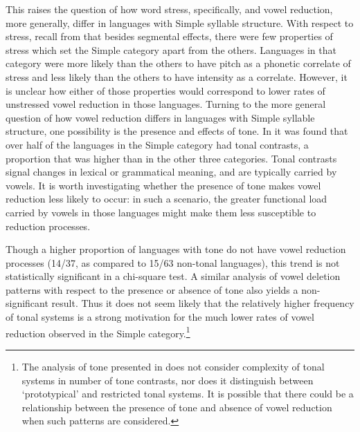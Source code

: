   This raises the question of how word stress, specifically, and vowel reduction, more generally, differ in languages with Simple syllable structure. With respect to stress, recall from  that besides segmental effects, there were few properties of stress which set the Simple category apart from the others. Languages in that category were more likely than the others to have pitch as a phonetic correlate of stress and less likely than the others to have intensity as a correlate. However, it is unclear how either of those properties would correspond to lower rates of unstressed vowel reduction in those languages. Turning to the more general question of how vowel reduction differs in languages with Simple syllable structure, one possibility is the presence and effects of tone. In  it was found that over half of the languages in the Simple category had tonal contrasts, a proportion that was higher than in the other three categories. Tonal contrasts signal changes in lexical or grammatical meaning, and are typically carried by vowels. It is worth investigating whether the presence of tone makes vowel reduction less likely to occur: in such a scenario, the greater functional load carried by vowels in those languages might make them less susceptible to reduction processes.

  Though a higher proportion of languages with tone do not have vowel reduction processes (14/37, as compared to 15/63 non-tonal languages), this trend is not statistically significant in a chi-square test. A similar analysis of vowel deletion patterns with respect to the presence or absence of tone also yields a non-significant result. Thus it does not seem likely that the relatively higher frequency of tonal systems is a strong motivation for the much lower rates of vowel reduction observed in the Simple category.\footnote{{The analysis of tone presented in  does not consider complexity of tonal systems in number of tone contrasts,  nor does it distinguish between ‘prototypical’ and restricted tonal systems. It is possible that there could be a relationship between the presence of tone and absence of vowel reduction when such patterns are considered.}}

